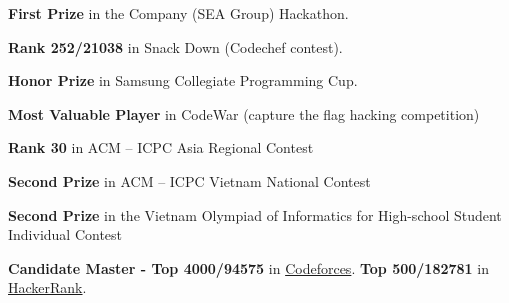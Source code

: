 \begin{cvempty} %
  \begin{cvitems} %
    \item {\textbf{First Prize} in the Company (SEA Group) Hackathon.\hfill{}}
    \item {\textbf{Rank 252/21038} in Snack Down (Codechef contest).\hfill{}}
    \item {\textbf{Honor Prize} in Samsung Collegiate Programming Cup.\hfill{}}
    \item {\textbf{Most Valuable Player} in CodeWar (capture the flag hacking competition)\hfill{}}
    \item {\textbf{Rank 30} in ACM – ICPC Asia Regional Contest\hfill{}}
    \item {\textbf{Second Prize} in ACM – ICPC Vietnam National Contest\hfill{}}
    \item {\textbf{Second Prize} in the Vietnam Olympiad of Informatics for High-school Student Individual Contest\hfill{}}
    \item {\textbf{Candidate Master - Top 4000/94575} in \href{http://codeforces.com/profile/Indecchi}{Codeforces}. \textbf{Top 500/182781} in \href{https://www.hackerrank.com/tuantt}{HackerRank}.}
  \end{cvitems}

\end{cvempty}
